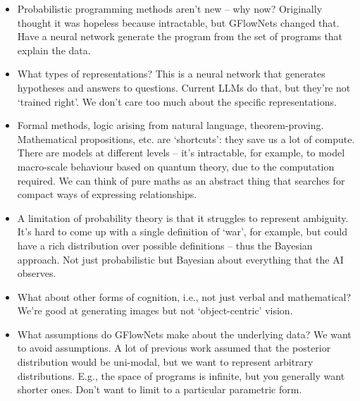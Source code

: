 \begin{itemize}
  \item Probabilistic programming methods aren't new -- why now?
        Originally thought it was hopeless because intractable, but GFlowNets changed that.
        Have a neural network generate the program from the set of programs that explain the
        data.
  \item What types of representations?
        This is a neural network that generates hypotheses and answers to questions.
        Current LLMs do that, but they're not `trained right'.
        We don't care too much about the specific representations.
  \item Formal methods, logic arising from natural language, theorem-proving.
        Mathematical propositions, etc. are `shortcuts': they save us a lot of compute.
        There are models at different levels -- it's intractable, for example, to model
        macro-scale behaviour based on quantum theory, due to the computation required.
        We can think of pure maths as an abstract thing that searches for compact ways of
        expressing relationships.
  \item A limitation of probability theory is that it struggles to represent ambiguity.
        It's hard to come up with a single definition of `war', for example, but could have a
        rich distribution over possible definitions -- thus the Bayesian approach.
        Not just probabilistic but Bayesian about everything that the AI observes.
  \item What about other forms of cognition, i.e., not just verbal and mathematical?
        We're good at generating images but not `object-centric' vision.
  \item What assumptions do GFlowNets make about the underlying data?
        We want to avoid assumptions.
        A lot of previous work assumed that the posterior distribution would be uni-modal, but
        we want to represent arbitrary distributions.
        E.g., the space of programs is infinite, but you generally want shorter ones.
        Don't want to limit to a particular parametric form.
\end{itemize}
